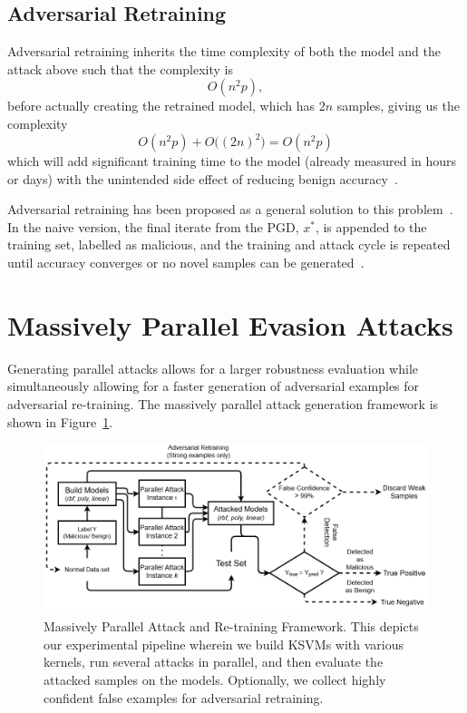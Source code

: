 \documentclass[fonts]{icst}
\begin{document}
\subsection{Adversarial Retraining}
\label{retrain}
Adversarial retraining inherits the time complexity of both the model and the attack above such that the complexity is
$$
    O(n^2p),
$$
before actually creating the retrained model, which has $2n$ samples, giving us the complexity
$$
    O(n^2p) + O\big((2n)^2\big) = O(n^2p)
$$
which will add significant training time to the model (already measured in hours or days) with the unintended side effect of reducing benign accuracy~\cite{stutz2019confidence}.

Adversarial retraining has been proposed as a general solution to this problem~\cite{li2016general,stutz2019confidence}. In the naive version, the final iterate from the PGD, $x^{*}$, is appended to the training set, labelled as malicious, and the training and attack cycle is repeated until accuracy converges or no novel samples can be generated~\cite{li2016general}.

\section{Massively Parallel Evasion Attacks}


Generating parallel attacks allows for a larger robustness evaluation while simultaneously allowing for a faster generation of adversarial examples for adversarial re-training. The massively parallel attack generation framework is shown in Figure~\ref{fig:attack_framework}.


\begin{figure}[!htb]
\centering
\includegraphics[width=\textwidth]{./generated/PPGD.png}
\caption{Massively Parallel Attack and Re-training Framework.  This depicts our experimental pipeline wherein we build KSVMs with various kernels, run several attacks in parallel, and then evaluate the attacked samples on the models. Optionally, we collect highly confident false examples for adversarial retraining.}
\label{fig:attack_framework}

\end{figure}
\end{document}
